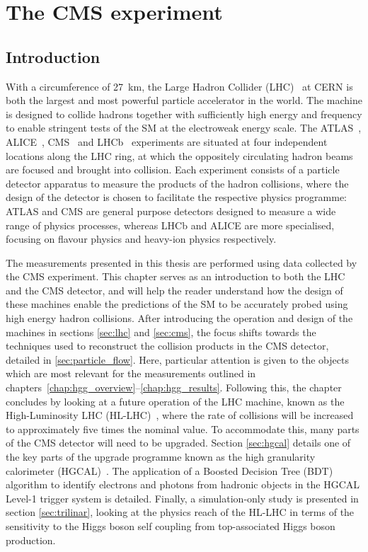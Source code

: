 \chapter{The CMS experiment}
\label{chap:cms}

\section{Introduction}
With a circumference of 27~km, the Large Hadron Collider (LHC)~\cite{} at CERN is both the largest and most powerful particle accelerator in the world. The machine is designed to collide hadrons together with sufficiently high energy and frequency to enable stringent tests of the SM at the electroweak energy scale. The ATLAS~\cite{}, ALICE~\cite{}, CMS~\cite{} and LHCb~\cite{} experiments are situated at four independent locations along the LHC ring, at which the oppositely circulating hadron beams are focused and brought into collision. Each experiment consists of a particle detector apparatus to measure the products of the hadron collisions, where the design of the detector is chosen to facilitate the respective physics programme: ATLAS and CMS are general purpose detectors designed to measure a wide range of physics processes, whereas LHCb and ALICE are more specialised, focusing on flavour physics and heavy-ion physics respectively. 

The measurements presented in this thesis are performed using data collected by the CMS experiment. This chapter serves as an introduction to both the LHC and the CMS detector, and will help the reader understand how the design of these machines enable the predictions of the SM to be accurately probed using high energy hadron collisions. After introducing the operation and design of the machines in sections \ref{sec:lhc} and \ref{sec:cms}, the focus shifts towards the techniques used to reconstruct the collision products in the CMS detector, detailed in \ref{sec:particle_flow}. Here, particular attention is given to the objects which are most relevant for the \Hgg measurements outlined in chapters~\ref{chap:hgg_overview}--\ref{chap:hgg_results}. Following this, the chapter concludes by looking at a future operation of the LHC machine, known as the High-Luminosity LHC (HL-LHC)~\cite{}, where the rate of collisions will be increased to approximately five times the nominal value. To accommodate this, many parts of the CMS detector will need to be upgraded. Section \ref{sec:hgcal} details one of the key parts of the upgrade programme known as the high granularity calorimeter (HGCAL)~\cite{}. The application of a Boosted Decision Tree (BDT) algorithm to identify electrons and photons from hadronic objects in the HGCAL Level-1 trigger system is detailed. Finally, a simulation-only study is presented in section \ref{sec:trilinar}, looking at the physics reach of the HL-LHC in terms of the sensitivity to the Higgs boson self coupling from top-associated Higgs boson production.

